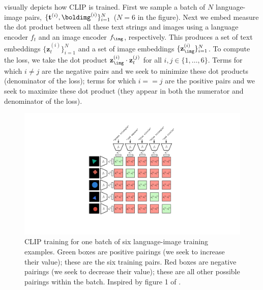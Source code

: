 \Fig{\ref{fig:vision_and_language:clip_training}} visually depicts how CLIP is trained. First we sample a batch of $N$ language-image pairs, $\{\mathbf{t}^{(i)}, \boldimg^{(i)}\}_{i=1}^N$ ($N=6$ in the figure). Next we embed measure the dot product between all these text strings and images using a language encoder $f_t$ and an image encoder $f_\img$, respectively. This produces a set of text embeddings $\{\mathbf{z}^{(i)}_t\}_{i=1}^N$ and a set of image embeddings $\{\mathbf{z}^{(i)}_\img\}_{i=1}^N$. To compute the loss, we take the dot product $\mathbf{z}^{(i)}_\img \cdot \mathbf{z}^{(j)}_t$ for all $i, j \in \{1,\ldots,6\}$. Terms for which $i \neq j$ are the negative pairs and we seek to minimize these dot products (denominator of the loss); terms for which $i == j$ are the positive pairs and we seek to maximize these dot product (they appear in both the numerator and denominator of the loss).
\begin{figure}[h]
    \centerline{
        \includegraphics[width=0.85\linewidth]{figures/vision_and_language/clip_training_fig.pdf}
    }
    \caption{CLIP training for one batch of six language-image training examples. Green boxes are positive pairings (we seek to increase their value); these are the six training pairs. Red boxes are negative pairings (we seek to decrease their value); these are all other possible pairings within the batch. Inspired by figure 1 of \cite{radford2021learning}.}
    \label{fig:vision_and_language:clip_training}
\end{figure}


